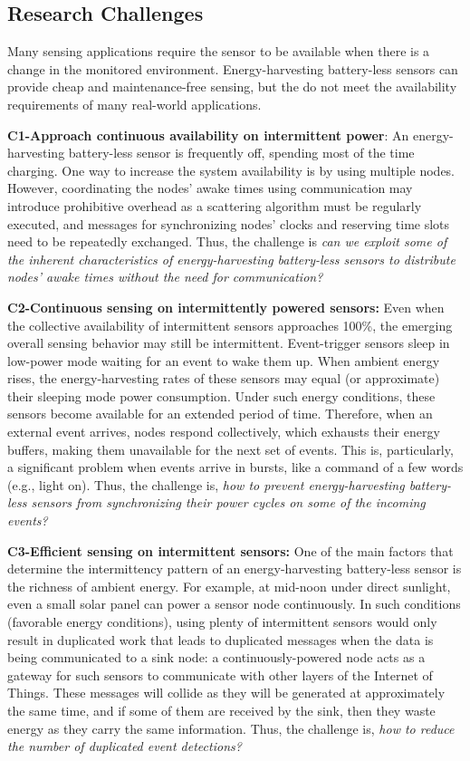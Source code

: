 \subsection{Research Challenges}
Many sensing applications require the sensor to be available when there is a change in the monitored environment.
Energy-harvesting battery-less sensors can provide cheap and maintenance-free sensing, but the do not meet the availability requirements of many real-world applications. 

\noindent\textbf{C1-Approach continuous availability on intermittent power}: 
An energy-harvesting battery-less sensor is frequently off, spending most of the time charging. 
One way to increase the system availability is by using multiple nodes.
However, coordinating the nodes' awake times using communication may introduce prohibitive overhead as a scattering algorithm must be regularly executed, and messages for synchronizing nodes' clocks and reserving time slots need to be repeatedly exchanged.
Thus, the challenge is \emph{can we exploit some of the inherent characteristics of energy-harvesting battery-less sensors to distribute nodes' awake times without the need for communication?}

\noindent\textbf{C2-Continuous sensing on intermittently powered sensors:}  
Even when the collective availability of intermittent sensors approaches 100\%, the emerging overall sensing behavior may still be intermittent. 
Event-trigger sensors sleep in low-power mode waiting for an event to wake them up. 
When ambient energy rises, the energy-harvesting rates of these sensors may equal (or approximate) their sleeping mode power consumption.
Under such energy conditions, these sensors become available for an extended period of time. 
Therefore, when an external event arrives, nodes respond collectively, which exhausts their energy buffers, making them unavailable for the next set of events. 
This is, particularly, a significant problem when events arrive in bursts, like a command of a few words (e.g., light on). 
Thus, the challenge is, \emph{how to prevent energy-harvesting battery-less sensors from synchronizing their power cycles on some of the incoming events?}

\noindent\textbf{C3-Efficient sensing on intermittent sensors:} 
One of the main factors that determine the intermittency pattern of an energy-harvesting battery-less sensor is the richness of ambient energy. 
For example, at mid-noon under direct sunlight, even a small solar panel can power a sensor node continuously. 
In such conditions (favorable energy conditions), using plenty of intermittent sensors would only result in duplicated work that leads to duplicated messages when the data is being communicated to a sink node: a continuously-powered node acts as a gateway for such sensors to communicate with other layers of the Internet of Things. These messages will collide as they will be generated at approximately the same time, and if some of them are received by the sink, then they waste energy as they carry the same information. Thus, the challenge is, \emph{how to reduce the number of duplicated event detections?} 
%
